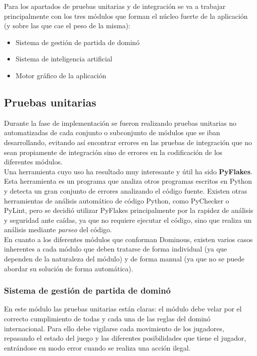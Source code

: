 Para los apartados de pruebas unitarias y de integración se va a trabajar principalmente con los tres módulos que
forman el núcleo fuerte de la aplicación (y sobre las que cae el peso de la misma):

\begin{itemize}
    \item Sistema de gestión de partida de dominó
    \item Sistema de inteligencia artificial
    \item Motor gráfico de la aplicación
\end{itemize}

\subsection{Pruebas unitarias}

Durante la fase de implementación se fueron realizando pruebas unitarias no automatizadas de cada conjunto o subconjunto
de módulos que se iban desarrollando, evitando así encontrar errores en las pruebas de integración que no sean propiamente
de integración sino de errores en la codificación de los diferentes módulos. \\

Una herramienta cuyo uso ha resultado muy interesante y útil ha sido \textbf{PyFlakes}. Esta herramienta es un programa que
analiza otros programas escritos en Python y detecta un gran conjunto de errores analizando el código fuente. Existen otras
herramientas de análisis automático de código Python, como PyChecker o PyLint, pero se decidió utilizar PyFlakes
principalmente por la rapidez de análisis y seguridad ante caídas, ya que no requiere ejecutar el código, sino que realiza
un análisis mediante \emph{parseo} del código. \\

En cuanto a los diferentes módulos que conforman Dominous, existen varios casos inherentes a cada módulo que deben
tratarse de forma individual (ya que dependen de la naturaleza del módulo) y de forma manual (ya que no se puede abordar su
solución de forma automática).

\subsubsection{Sistema de gestión de partida de dominó}

En este módulo las pruebas unitarias están claras: el módulo debe velar por el correcto cumplimiento de todas y cada
una de las reglas del dominó internacional. Para ello debe vigilarse cada movimiento de los jugadores, repasando
el estado del juego y las diferentes posibilidades que tiene el jugador, entrándose en modo error cuando se realiza
una acción ilegal. \\

